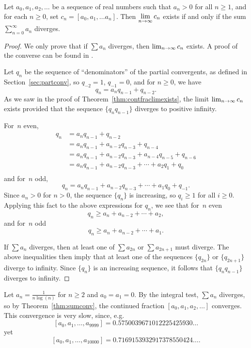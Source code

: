\begin{theorem}\label{thm:sumconv}
Let $a_0, a_1, a_2, \ldots $ be a sequence of real numbers
such that $a_n > 0$ for all $n\geq 1$, and for each $n\geq 0$, set
$c_n = [a_0, a_1, \ldots a_n].$
Then $\displaystyle\lim_{n\rightarrow \infty} c_n$ exists if and only if the sum
$\sum_{n=0}^{\infty} a_n$ diverges.
\end{theorem}
\begin{proof}
  We only prove that if $\sum a_n$ diverges, then $\lim_{n\rightarrow\infty}
  c_n$ exists.  A proof of the converse can be found in
  \cite[Ch.~2, Thm.~6.1]{wall}.

Let $q_n$ be the sequence of ``denominators''
of the partial convergents, as defined in Section~\ref{sec:partconv},
so $q_{-2}=1$, $q_{-1}=0$, and for $n\geq 0$, we have
$$
  q_n = a_n q_{n-1} + q_{n-2}.
$$
As we saw in the proof of Theorem~\ref{thm:contfraclimexists},
the limit $\lim_{n\rightarrow\infty} c_n$ exists provided that
the sequence $\{q_nq_{n-1}\}$ diverges to positive infinity.

For~$n$ even,
\begin{align*}
q_n &= a_n q_{n-1} + q_{n-2}\\
    &= a_n q_{n-1} + a_{n-2}q_{n-3} + q_{n-4}\\
    &= a_n q_{n-1} + a_{n-2}q_{n-3} + a_{n-4}q_{n-5} + q_{n-6} \\
    &= a_n q_{n-1} + a_{n-2}q_{n-3} + \cdots + a_2 q_{1} + q_0\\
\end{align*}
and for~$n$ odd,
$$
q_n =  a_n q_{n-1} + a_{n-2}q_{n-3} + \cdots + a_1 q_{0} + q_{-1}.
$$
Since $a_n>0$ for $n>0$, the sequence $\{q_n\}$ is increasing, so
$q_i\geq 1$ for all $i\geq 0$.
Applying this fact to the above expressions for $q_n$, we see that
for~$n$ even
$$
 q_n \geq a_n + a_{n-2} + \cdots + a_2,
$$
and for~$n$ odd
$$
 q_n \geq a_n + a_{n-2} + \cdots + a_1.
$$

If $\sum a_n$ diverges, then at least one of
$\sum a_{2n}$ or $\sum a_{2n+1}$ must diverge.  The
above inequalities then imply that
at least one of the sequences
$\{q_{2n}\}$ or $\{q_{2n+1}\}$ diverge to infinity.
Since $\{q_n\}$ is an increasing sequence, it follows
that $\{q_{n} q_{n-1}\}$ diverges to infinity.
\end{proof}

\begin{example}
  Let $a_n = \frac{1}{n\log(n)}$ for $n\geq 2$ and $a_0=a_1=0$.  By the
  integral test, $\sum a_n$ diverges, so by Theorem~\ref{thm:sumconv},
  the continued fraction $[a_0,a_1,a_2,\ldots]$ converges.
  This convergence is very slow, since, e.g.
  $$[a_0, a_1, \ldots, a_{9999}] = 0.5750039671012225425930\ldots$$
  yet
  $$[a_0, a_1, \ldots, a_{10000}] = 0.7169153932917378550424\ldots.$$
\end{example}


